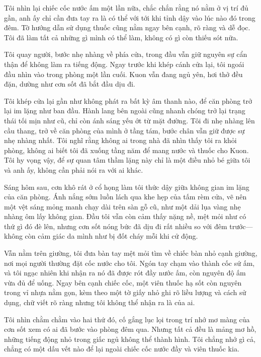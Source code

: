 \documentclass[../main.tex]{subfiles}
\begin{document}
Tôi nhìn lại chiếc cốc nước ấm một lần nữa, chắc chắn rằng nó nằm ở vị trí đủ gần, anh ấy chỉ cần đưa tay ra là có thể với tới khi tỉnh dậy vào lúc nào đó trong đêm. Tờ hướng dẫn sử dụng thuốc cũng nằm ngay bên cạnh, rõ ràng và dễ đọc. Tôi đã làm tất cả những gì mình có thể làm, không có gì còn thiếu sót nữa. 

Tôi quay người, bước nhẹ nhàng về phía cửa, trong đầu vẫn giữ nguyên sự cẩn thận để không làm ra tiếng động. Ngay trước khi khép cánh cửa lại, tôi ngoái đầu nhìn vào trong phòng một lần cuối. Kuon vẫn đang ngủ yên, hơi thở đều đặn, dường như cơn sốt đã bắt đầu dịu đi.

Tôi khép cửa lại gần như không phát ra bất kỳ âm thanh nào, để căn phòng trở lại im lặng như ban đầu. Hành lang bên ngoài cũng nhanh chóng trở lại trạng thái tối mịn như cũ, chỉ còn ánh sáng yếu ớt từ mặt đường. Tôi đi nhẹ nhàng lên cầu thang, trở về căn phòng của mình ở tầng tám, bước chân vẫn giữ được sự nhẹ nhàng nhất. Tôi nghĩ rằng không ai trong nhà đã nhìn thấy tôi ra khỏi phòng, không ai biết tôi đã xuống tầng năm để mang nước và thuốc cho Kuon. Tôi hy vọng vậy, để sự quan tâm thầm lặng này chỉ là một điều nhỏ bé giữa tôi và anh ấy, không cần phải nói ra với ai khác.

\ct


Sáng hôm sau, cơn khô rát ở cổ họng làm tôi thức dậy giữa không gian im lặng của căn phòng. Ánh nắng sớm luồn lách qua khe hẹp của tấm rèm cửa, vẽ nên một vệt sáng mỏng manh chạy dài trên sàn gỗ cũ, như một dải lụa vàng nhẹ nhàng ôm lấy không gian. Đầu tôi vẫn còn cảm thấy nặng nề, mệt mỏi như có thứ gì đó đè lên, nhưng cơn sốt nóng bức đã dịu đi rất nhiều so với đêm trước—không còn cảm giác da mình như bị đốt cháy mỗi khi cử động.

Vẫn nằm trên giường, tôi đưa bàn tay mệt mỏi tìm về chiếc bàn nhỏ cạnh giường, nơi mọi người thường đặt cốc nước cho tôi. Ngón tay chạm vào thành cốc sứ ấm, và tôi ngạc nhiên khi nhận ra nó đã được rót đầy nước ấm, còn nguyên độ ấm vừa đủ để uống. Ngay bên cạnh chiếc cốc, một viên thuốc hạ sốt còn nguyên trong vỉ nhựa nằm gọn, kèm theo một tờ giấy nhỏ ghi rõ liều lượng và cách sử dụng, chữ viết rõ ràng nhưng tôi không thể nhận ra là của ai.

Tôi nhìn chằm chằm vào hai thứ đó, cố gắng lục lọi trong trí nhớ mơ màng của cơn sốt xem có ai đã bước vào phòng đêm qua. Nhưng tất cả đều là mảng mơ hồ, những tiếng động nhỏ trong giấc ngủ không thể thành hình. Tôi chẳng nhớ gì cả, chẳng có một dấu vết nào để lại ngoài chiếc cốc nước đầy và viên thuốc kia.
\end{document}
